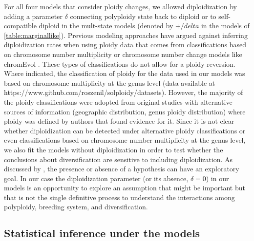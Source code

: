 For all four models that consider ploidy changes, we allowed diploidization by adding a parameter $\delta$ connecting polyploidy state back to diploid or to self-compatible diploid in the mult-state models (denoted by $+/delta$ in the models of  \cref{table:marginallike}).
Previous modeling approaches \citep{mayrose_2011} have argued against inferring diploidization rates when using ploidy data that comes from classifications based on chromosome number multiplicity or chromosome number change models like chromEvol \citep{mayrose_2010, glick2014, mayrose_2015, freyman_2017}.
These types of classifications do not allow for a ploidy reversion.
Where indicated, the classification of ploidy for the data used in our models was based on chromosome multiplicity at the genus level (data available at https://www.github.com/roszenil/solploidy/datasets).
However, the majority of the ploidy classifications were adopted from original studies with alternative sources of information (\eg geographic distribution, genus ploidy distribution) where ploidy was defined by authors that found evidence for it.
Since it is not clear whether diploidization can be detected under alternative ploidy classifications or even classifications based on chromosome number multiplicity at the genus level, we also fit the models without diploidization in order to test  whether the conclusions about diversification are sensitive to including diploidization.
As discussed by \citet{servedio_2014}, the presence or absence of a hypothesis can have an exploratory goal.
In our case the diploidization parameter (or its absence, $\delta=0$) in our models is an opportunity to explore an assumption that might be important but that is not the single definitive process to understand the interactions among polyploidy, breeding system, and diversification.

\subsection{Statistical inference under the models}

